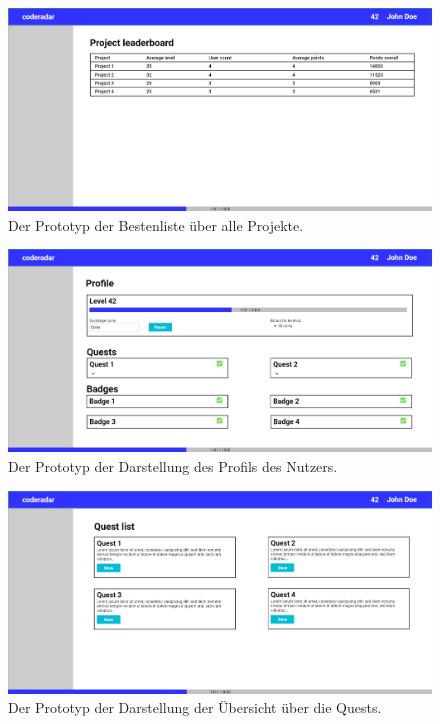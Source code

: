 \documentclass[
	oneside,  %
	ngerman, 
	final, 
	11pt, 
	a4paper, 
	1.1headlines, 
	headinclude=false, 
	footinclude=false, 
	mpinclude=false, 
	pagesize, 
	onecolumn, 
	titlepage, 
	parskip=half, 
	headsepline, 
	chapterprefix=false, 
	version=first, 
	listof=totoc, 
	bibliography=totoc, 
	toc=graduated, 
	fleqn
]{scrbook}
\begin{document}
\begin{figure}[htb]
	\begin{center}
		\includegraphics[width=\linewidth]{images/mock_leaderboards_projects}
		\caption{Der Prototyp der Bestenliste über alle Projekte.}
		\label{mock_leaderboards_projects}
	\end{center}
\end{figure}

\begin{figure}[htb]
	\begin{center}
		\includegraphics[width=\linewidth]{images/mock_profile}
		\caption{Der Prototyp der Darstellung des Profils des Nutzers.}
		\label{mock_profile}
	\end{center}
\end{figure}

\begin{figure}[htb]
	\begin{center}
		\includegraphics[width=\linewidth]{images/mock_quest_list}
		\caption{Der Prototyp der Darstellung der Übersicht über die Quests.}
		\label{mock_quest_overview}
	\end{center}
\end{figure}
\end{document}
